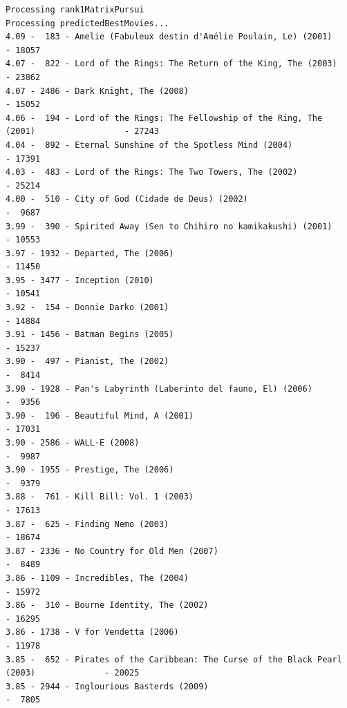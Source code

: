 \documentclass[11pt, a4paper, titlepage, openright]{article}
\begin{document}
\begin{lstlisting}
Processing rank1MatrixPursui
Processing predictedBestMovies...
4.09 -  183 - Amelie (Fabuleux destin d'Amélie Poulain, Le) (2001)                       - 18057
4.07 -  822 - Lord of the Rings: The Return of the King, The (2003)                      - 23862
4.07 - 2486 - Dark Knight, The (2008)                                                    - 15052
4.06 -  194 - Lord of the Rings: The Fellowship of the Ring, The (2001)                  - 27243
4.04 -  892 - Eternal Sunshine of the Spotless Mind (2004)                               - 17391
4.03 -  483 - Lord of the Rings: The Two Towers, The (2002)                              - 25214
4.00 -  510 - City of God (Cidade de Deus) (2002)                                        -  9687
3.99 -  390 - Spirited Away (Sen to Chihiro no kamikakushi) (2001)                       - 10553
3.97 - 1932 - Departed, The (2006)                                                       - 11450
3.95 - 3477 - Inception (2010)                                                           - 10541
3.92 -  154 - Donnie Darko (2001)                                                        - 14884
3.91 - 1456 - Batman Begins (2005)                                                       - 15237
3.90 -  497 - Pianist, The (2002)                                                        -  8414
3.90 - 1928 - Pan's Labyrinth (Laberinto del fauno, El) (2006)                           -  9356
3.90 -  196 - Beautiful Mind, A (2001)                                                   - 17031
3.90 - 2586 - WALL·E (2008)                                                              -  9987
3.90 - 1955 - Prestige, The (2006)                                                       -  9379
3.88 -  761 - Kill Bill: Vol. 1 (2003)                                                   - 17613
3.87 -  625 - Finding Nemo (2003)                                                        - 18674
3.87 - 2336 - No Country for Old Men (2007)                                              -  8489
3.86 - 1109 - Incredibles, The (2004)                                                    - 15972
3.86 -  310 - Bourne Identity, The (2002)                                                - 16295
3.86 - 1738 - V for Vendetta (2006)                                                      - 11978
3.85 -  652 - Pirates of the Caribbean: The Curse of the Black Pearl (2003)              - 20025
3.85 - 2944 - Inglourious Basterds (2009)                                                -  7805
\end{lstlisting}
\end{document}
